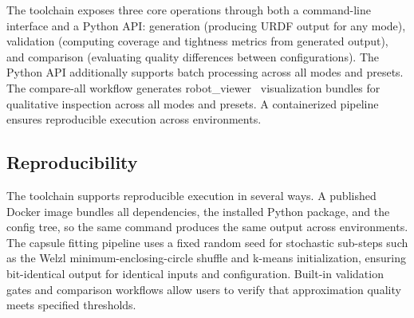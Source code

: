 The toolchain exposes three core operations through both a command-line interface and a Python API: generation (producing URDF output for any mode), validation (computing coverage and tightness metrics from generated output), and comparison (evaluating quality differences between configurations). The Python API additionally supports batch processing across all modes and presets. The compare-all workflow generates robot\_viewer~\cite{robot_viewer} visualization bundles for qualitative inspection across all modes and presets. A containerized pipeline ensures reproducible execution across environments.

\subsection{Reproducibility}

The toolchain supports reproducible execution in several ways.
A published Docker image bundles all dependencies, the installed Python package, and the config tree, so the same command produces the same output across environments.
The capsule fitting pipeline uses a fixed random seed for stochastic sub-steps such as the Welzl minimum-enclosing-circle shuffle and k-means initialization, ensuring bit-identical output for identical inputs and configuration.
Built-in validation gates and comparison workflows allow users to verify that approximation quality meets specified thresholds.
